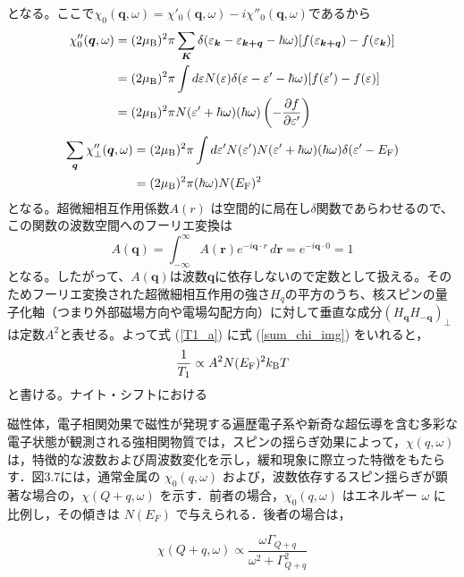 \documentclass[11pt,a4j]{jreport}
\begin{document}
となる。ここで$\chi_0(\bm q, \omega)=\chi'_0(\bm q,\omega)-i\chi''_0(\bm q,\omega)$であるから
\begin{align}
  \chi''_0(\bm q,\omega) &= (2\mu_{\text B})^2\pi \sum_{\bm K}{\delta(\varepsilon_{\bm k}-\varepsilon_{\bm{k+q}}-\hbar\omega)[f(\varepsilon_{\bm{k+q}})-f(\varepsilon_{\bm k})]}\\
  &=(2\mu_{\text B})^2\pi\int d\varepsilon N(\varepsilon)\delta(\varepsilon-\varepsilon'-\hbar\omega)[f(\varepsilon')-f(\varepsilon)]\,\\
  &= (2\mu_{\text B})^2 \pi N(\varepsilon'+\hbar\omega)(\hbar\omega)\left(-\frac{\partial f}{\partial \varepsilon'}\right)
\end{align}
\begin{align}
  \sum_{\bm q} \chi''_\bot(\bm q,\omega) &= (2\mu_{\text B})^2 \pi \int d\varepsilon' N(\varepsilon')N(\varepsilon'+\hbar\omega)(\hbar\omega)\delta(\varepsilon'-E_{\text F})\\
  &= (2\mu_{\text B})^2\pi(\hbar\omega)N(E_{\text F})^2
  \label{sum_chi_img}
\end{align}
となる。超微細相互作用係数$ A(r) $ は空間的に局在し$ \delta $関数であらわせるので、この関数の波数空間へのフーリエ変換は
\begin{equation}
  A(\bm q)=\int_{-\infty}^{\infty} A(\bm r)e^{-i \bm q \cdot r}\,d \bm r = e^{-i \bm q \cdot 0}=1
\end{equation}
となる。したがって、$A(\bm q)$は波数$\bm q$に依存しないので定数として扱える。そのためフーリエ変換された超微細相互作用の強さ$H_q$の平方のうち、核スピンの量子化軸（つまり外部磁場方向や電場勾配方向）に対して垂直な成分$(H_{\bm q}H_{-\bm q})_\bot$は定数$A^2$と表せる。よって式 (\ref{T1_a}) に式 (\ref{sum_chi_img}) をいれると，
\begin{equation}
  \frac{1}{T_1} \propto A^2 N(E_{\text F})^2 k_{\text B} T
\end{equation}
と書ける。ナイト・シフトにおける

磁性体，電子相関効果で磁性が発現する遍歴電子系や新奇な超伝導を含む多彩な電子状態が観測される強相関物質では，スピンの揺らぎ効果によって，$\chi(q,\omega)$ は，特徴的な波数および周波数変化を示し，緩和現象に際立った特徴をもたらす．図3.7には，通常金属の $\chi_0(q,\omega)$ および，波数依存するスピン揺らぎが顕著な場合の，$\chi(Q+q,\omega)$ を示す．前者の場合，$\chi_0(q,\omega)$ はエネルギー $\omega$ に比例し，その傾きは $N(E_F)$ で与えられる．後者の場合は，



\begin{equation}
  \chi(Q+q,\omega) \propto \frac{\omega \Gamma_{Q+q}}{\omega^2 + \Gamma_{Q+q}^2} 
\end{equation}
\end{document}
